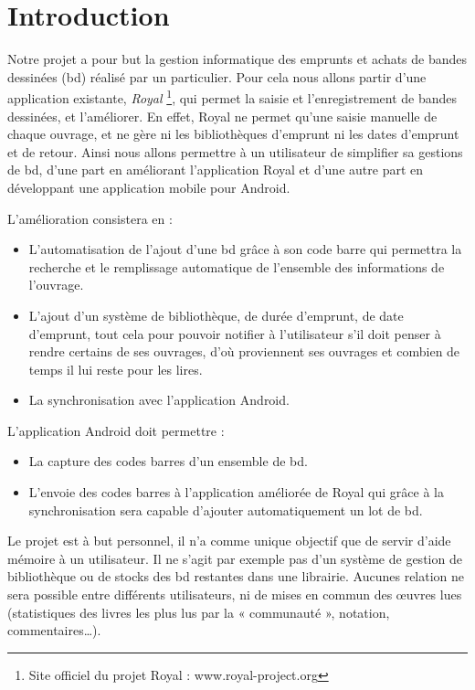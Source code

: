 \part*{Introduction}
Notre projet a pour but la gestion informatique des emprunts et achats de bandes dessinées (bd) réalisé par un particulier.
Pour cela nous allons partir d'une application existante, \emph{Royal}
\footnote{Site officiel du projet Royal : www.royal-project.org}, qui permet la saisie et l'enregistrement de bandes dessinées, et l'améliorer.
En effet, Royal ne permet qu'une saisie manuelle de chaque ouvrage, et ne gère ni les bibliothèques d'emprunt ni les dates d'emprunt et de retour. Ainsi nous allons permettre à un utilisateur de simplifier sa gestions de bd, d'une part en améliorant l'application Royal et d'une autre part en développant une application mobile pour Android.

L'amélioration consistera en :
\begin{itemize}
\item L'automatisation de l'ajout d'une bd grâce à son code barre qui permettra la recherche et le remplissage automatique de l'ensemble des informations de l'ouvrage.
\item L'ajout d'un système de bibliothèque, de durée d'emprunt, de date d'emprunt, tout cela pour pouvoir notifier à l'utilisateur s'il doit penser à rendre certains de ses ouvrages, d'où proviennent ses ouvrages et combien de temps il lui reste pour les lires.
\item La synchronisation avec l'application Android.
\end{itemize}

L'application Android doit permettre :
\begin{itemize}
\item La capture des codes barres d'un ensemble de bd.
\item L'envoie des codes barres à l'application améliorée de Royal qui grâce à la synchronisation sera capable d'ajouter automatiquement un lot de bd.
\end{itemize}

Le projet est à but personnel, il n'a comme unique objectif que de servir d'aide mémoire à un utilisateur.
Il ne s'agit par exemple pas d'un système de gestion de bibliothèque ou de stocks des bd restantes dans une librairie.
Aucunes relation ne sera possible entre différents utilisateurs, ni de mises en commun des œuvres lues
(statistiques des livres les plus lus par la « communauté », notation, commentaires…).
